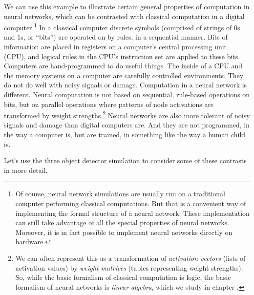 We can use this example to illustrate certain  general properties of computation in neural networks, which can be contrasted with classical computation in a digital computer.\footnote{Of course, neural network simulations are usually run on a traditional computer performing classical computations. But that is a convenient way of implementing the formal structure of a neural network. These implementation can still take advantage of all the special properties of neural networks. Moreover, it is in fact possible to implement neural networks directly on hardware.} In a classical computer discrete symbols (comprised of strings of 0s and 1s, or ``bits'') are operated on by rules, in a sequential manner. Bits of information are placed in registers on a computer's central processing unit (CPU), and logical rules in the CPU's instruction set are applied to these bits. Computers are hand-programmed to do useful things. The inside of a CPU and the memory systems on a computer are carefully controlled environments. They do not do well with noisy signals or damage. Computation in a neural network is  different. Neural computation is not based on sequential, rule-based operations on bits, but on parallel operations where patterns of node activations are transformed by weight strengths.\footnote{We can often represent this as a transformation of \emph{activation vectors} (lists of activation values) by \emph{weight matrices} (tables representing weight strengths). So, while the basic formalism of classical computation is logic,  the basic formalism of neural networks is \emph{linear algebra}, which we study in chapter .}    Neural networks are also more tolerant of noisy signals and damage than digital computers are. And they are not programmed, in the way a computer is, but are trained, in something like the way a human child is.

Let's use the three object detector simulation to consider some of these contrasts in more detail. 


